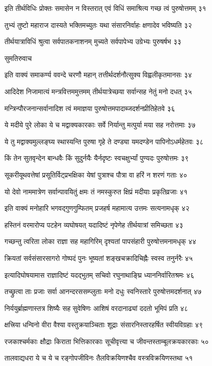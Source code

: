 इति तीर्थविधिः प्रोक्तः समासेन न विस्तरात्
एवं विधिं समाश्रित्य गच्छ त्वं पुरुषोत्तमम् ३१

तुभ्यं तुष्टो महाराज दास्यते भक्तिमच्युतः
यथा संसारनिर्वाहः क्षणादेव भविष्यति ३२

तीर्थयात्राविधिं श्रुत्वा सर्वपातकनाशनम्
मुच्यते सर्वपापेभ्य उग्रेभ्यः पुरुषर्षभ ३३

सुमतिरुवाच

इति वाक्यं समाकर्ण्य ववन्दे चरणौ महान्
तत्तीर्थदर्शनौत्सुक्य विह्वलीकृतमानसः ३४

आदिदेश निजामात्यं मन्त्रवित्तममुत्तमम्
तीर्थयात्रेच्छया सर्वान्सह नेतुं मनो दधत् ३५

मन्त्रिन्पौरजनान्सर्वानादिश त्वं ममाज्ञया
पुरुषोत्तमपादाब्जदर्शनप्रीतिहेतवे ३६

ये मदीये पुरे लोका ये च मद्वाक्यकारकाः
सर्वे निर्यान्तु मत्पुर्या मया सह नरोत्तमाः ३७

ये तु मद्वाक्यमुल्लङ्घ्य स्थास्यन्ति पुरुषा गृहे
ते दण्ड्या यमदण्डेन पापिनोऽधर्महेतवः ३८

किं तेन सुतवृन्देन बान्धवैः किं सुदुर्नयैः
यैर्नदृष्टः स्वचक्षुर्भ्यां पुण्यदः पुरुषोत्तमः ३९

सूकरीयूथवत्तेषां प्रसूतिर्विट्प्रभक्षिका
येषां पुत्राश्च पौत्रा वा हरिं न शरणं गताः ४०

यो देवो नाममात्रेण सर्वान्पावयितुं क्षमः
तं नमस्कुरुत क्षिप्रं मदीयाः प्रकृतिव्रजाः ४१

इति वाक्यं मनोहारि भगवद्गुणगुम्फितम्
प्रजहर्ष महामात्य उत्तमः सत्यनामधृक् ४२

हस्तिनं वरमारोप्य पटहेन व्यघोषयत्
यदादिष्टं नृपेणेह तीर्थयात्रां समिच्छता ४३

गच्छन्तु त्वरिता लोका राज्ञा सह महागिरिम्
दृश्यतां पापसंहारी पुरुषोत्तमनामधृक् ४४

क्रियतां सर्वसंसारसागरो गोष्पदं पुनः
भूष्यतां शङ्खचक्रादिचिह्नैः स्वस्व तनुर्नरैः ४५

इत्यादिघोषयामास राज्ञादिष्टं यदद्भुतम्
सचिवो रघुनाथाङ्घ्रि ध्याननिर्वारितश्रमः ४६

तच्छ्रुत्वा ताः प्रजाः सर्वा आनन्दरससम्प्लुताः
मनो दधुः स्वनिस्तारे पुरुषोत्तमदर्शनात् ४७

निर्ययुर्ब्राह्मणास्तत्र शिष्यैः सह सुवेषिणः
आशिषं वरदानाढ्यां ददतो भूमिपं प्रति ४८

क्षत्त्रिया धन्विनो वीरा वैश्या वस्तुक्रयाञ्चिताः
शूद्राः संसारनिस्तारहर्षित स्वीयविग्रहाः ४९

रजकाश्चर्मकाः क्षौद्राः किराता भित्तिकारकाः
सूचीवृत्त्या च जीवन्तस्ताम्बूलक्रयकारकाः ५०

तालवाद्यधरा ये च ये च रङ्गोपजीविनः
तैलविक्रयिणश्चैव वस्त्रविक्रयिणस्तथा ५१

